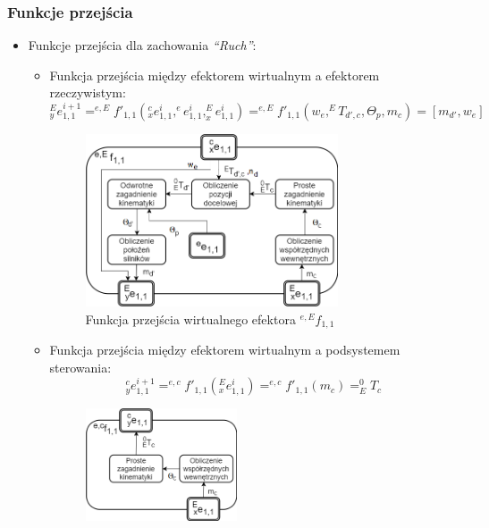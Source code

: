 \documentclass{article}
\begin{document}

\subsubsection{Funkcje przej\'scia}

\begin{itemize}
\item Funkcje przej\'scia dla zachowania \textit{``Ruch''}:
\begin{itemize}
\item Funkcja przej\'scia między efektorem wirtualnym a efektorem rzeczywistym:
\[^E_ye^{i+1}_{1,1}=^{e,E}f'_{1,1}(^c_xe_{1,1}^{i},^ee_{1,1}^{i},^E_xe_{1,1}^{i})=^{e,E}f'_{1,1}(w_e,^ET_{d',c},\Theta_p,m_c)=[m_{d'},w_e] \]
\begin{figure}[H]
	\centering
	\includegraphics[width=0.75\textwidth]{WE_funkcje1.png}
	\caption{Funkcja przej\'scia wirtualnego efektora $^{e,E}f_{1,1}$}
	\label{fig::WE_funkcje1}
\end{figure}
\item Funkcja przej\'scia między efektorem wirtualnym a podsystemem sterowania:
\[^c_ye^{i+1}_{1,1}=^{e,c}f'_{1,1}(^E_xe_{1,1}^{i})=^{e,c}f'_{1,1}(m_c)=^0_ET_c \]
\begin{figure}[H]
	\centering
	\includegraphics[width=0.45\textwidth]{WE_funkcje2.png}

\end{figure}
\end{itemize}
\end{itemize}
\end{document}
